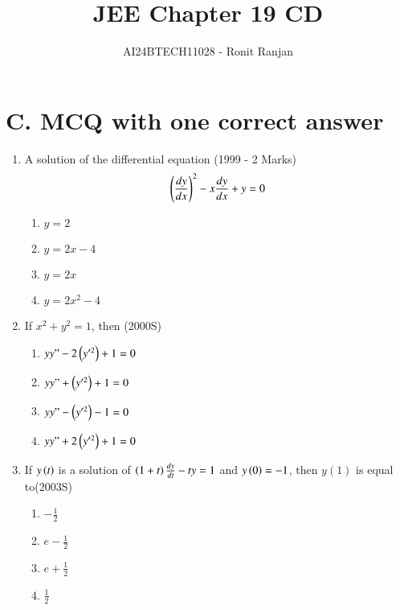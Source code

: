 \documentclass[journal,12pt,twocolumn]{IEEEtran}
\theoremstyle{remark}
\begin{document}

\vspace{3cm}

\title{JEE Chapter 19 CD}
\author{AI24BTECH11028 - Ronit Ranjan}
\maketitle
\newpage
\bigskip
\section*{C. MCQ with one correct answer}
\begin{enumerate}
\item A solution of the differential equation \hfill (1999 - 2 Marks)
\begin{align}
\left(\frac{dy}{dx}\right)^2 - x \frac{dy}{dx} + y = 0 
\end{align}
\begin{multicols}{2}
\begin{enumerate}
    \item $y = 2$
    \item $y = 2x -4$
    \item $y = 2x$
    \item $y = 2x^{2}-4$
\end{enumerate}
\end{multicols}

\item If $x^2 + y^2 = 1$, then \hfill (2000S)
\begin{multicols}{2}
\begin{enumerate}
    \item  $yy"-2\left(y'^{2}\right)+1 = 0$
    \item  $yy"+\left(y'^{2}\right)+1 = 0$
    \item  $yy"-\left(y'^{2}\right)-1 = 0$
    \item  $yy"+2\left(y'^{2}\right)+1 = 0$
\end{enumerate}
\end{multicols}

\item If $y\left(t\right)$ is a solution of $\left(1 + t\right) \frac{dy}{dt} - ty = 1$ and $y\left(0\right) = -1$, then $y(1)$ is equal to\hfill (2003S)
\begin{multicols}{2}
\begin{enumerate}
    \item $-\frac{1}{2}$
    \item $e - \frac{1}{2}$
    \item $e + \frac{1}{2}$
    \item $\frac{1}{2}$
\end{enumerate}
\end{multicols}


\end{enumerate}
\end{document}
